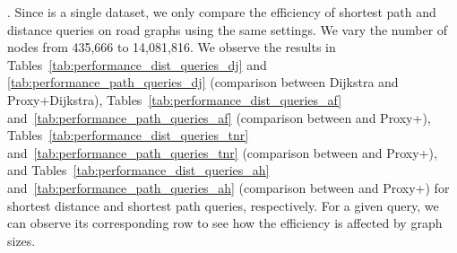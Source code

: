 


.
%
Since \dblpone is a single dataset, we only compare the efficiency of shortest path and distance queries on road graphs using the same settings. We vary the number of nodes from 435,666 to 14,081,816. We observe the results in
Tables~\ref{tab:performance_dist_queries_dj} and \ref{tab:performance_path_queries_dj} (comparison between Dijkstra and Proxy+Dijkstra), Tables~\ref{tab:performance_dist_queries_af} and~\ref{tab:performance_path_queries_af} (comparison between \arcflag and Proxy+\arcflag), Tables~\ref{tab:performance_dist_queries_tnr} and~\ref{tab:performance_path_queries_tnr} (comparison between \tnr and Proxy+\tnr), and Tables~\ref{tab:performance_dist_queries_ah} and~\ref{tab:performance_path_queries_ah} (comparison between \ah and Proxy+\ah) for shortest distance and shortest path queries, respectively. For a given query, we can observe its corresponding row to see how the efficiency is affected by graph sizes.








